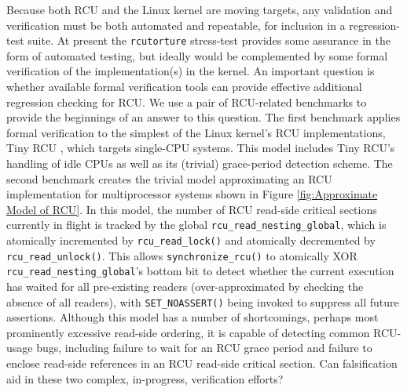 \documentclass{svjour3}
\begin{document}
Because both RCU and the Linux kernel are moving targets, any validation
and verification must be both automated and repeatable, for inclusion
in a regression-test suite.  At present the {\tt rcutorture}
stress-test provides some assurance in the form of automated testing,
but ideally would be complemented by some formal verification of the
implementation(s) in the kernel.  An important question is whether
available formal verification tools can provide effective additional
regression checking for RCU.
We use a pair of RCU-related benchmarks \cite{PaulBlog1,PaulBlog2} to
provide the beginnings of an answer to this question.  The first
benchmark applies formal verification to the simplest of the Linux
kernel's RCU implementations, Tiny RCU
\cite{PaulEMcKenney2009BloatwatchRCU}, which targets single-CPU
systems.  This model includes Tiny RCU's handling of idle CPUs as well
as its (trivial) grace-period detection scheme.  The second benchmark
creates the trivial model approximating an RCU implementation for
multiprocessor systems shown in Figure \ref{fig:Approximate Model of
  RCU}.  In this model, the number of RCU read-side critical sections
currently in flight is tracked by the global
{\tt rcu\_read\_nesting\_global}, which is atomically incremented by
{\tt rcu\_read\_lock()} and atomically decremented by
{\tt rcu\_read\_unlock()}.  This allows {\tt synchronize\_rcu()} to
atomically XOR {\tt rcu\_read\_nesting\_global}'s bottom bit to detect
whether the current execution has waited for all pre-existing readers
(over-approximated by checking the absence of all readers), with
{\tt SET\_NOASSERT()} being invoked to suppress all future assertions.
Although this model has a number of shortcomings, perhaps most
prominently excessive read-side ordering, it is capable of detecting
common RCU-usage bugs, including failure to wait for an RCU grace
period and failure to enclose read-side references in an RCU read-side
critical section.  Can falsification aid in these two complex,
in-progress, verification efforts?
\end{document}

